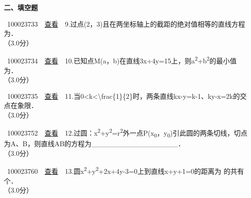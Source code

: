 \textbf{二、填空题}

~{{100023733}~~\href{../question/viewQuestionDetail.jsp?questionID=100023733\&testPaperId=100229072}{查看}~~9.过点(2，3)且在两坐标轴上的截距的绝对值相等的直线方程为．\\
\hspace*{0.333em}\hspace*{0.333em}（3.0分）\\
}

~{{100023734}~~\href{../question/viewQuestionDetail.jsp?questionID=100023734\&testPaperId=100229072}{查看}~~10.已知点M(a，b)在直线3x+4y=15上，则a\textsuperscript{2}+b\textsuperscript{2}的最小值为．\\
\hspace*{0.333em}\hspace*{0.333em}（3.0分）\\
}

~{{100023735}~~\href{../question/viewQuestionDetail.jsp?questionID=100023735\&testPaperId=100229072}{查看}~~11.当0\textless{}k\textless{}{\textbackslash{}frac\{1\}\{2\}}时，两条直线kx-y=k-1、ky-x=2k的交点在象限．\\
\hspace*{0.333em}\hspace*{0.333em}（3.0分）\\
}

~{{100023752}~~\href{../question/viewQuestionDetail.jsp?questionID=100023752\&testPaperId=100229072}{查看}~~12.过圆：x\textsuperscript{2}+y\textsuperscript{2}=r\textsuperscript{2}外一点P(x\textsubscript{0}，y\textsubscript{0})引此圆的两条切线，切点为A、B，则直线AB的方程为\_\_\_\_\_\_\_\_\_\_\_\_\_\_\_\_\_．\\
\hspace*{0.333em}\hspace*{0.333em}（3.0分）\\
}

~{{100023760}~~\href{../question/viewQuestionDetail.jsp?questionID=100023760\&testPaperId=100229072}{查看}~~13.圆x\textsuperscript{2}+y\textsuperscript{2}+2x+4y-3=0上到直线x+y+1=0的距离为
的共有个．\\
\hspace*{0.333em}\hspace*{0.333em}（3.0分）\\
}

~

~

~

~

~
